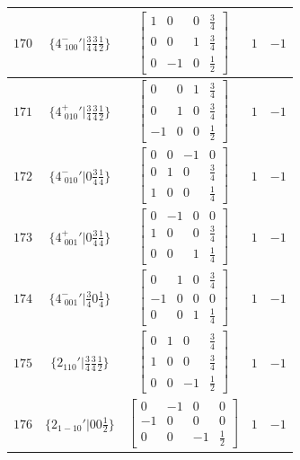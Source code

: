 \documentclass[fleqn,8pt]{jsarticle}
\begin{document}
\begin{longtable}{ccccc}
$ 170 $ & $ \{4^{-}_{\,\,100}{}'|\frac{3}{4} \frac{3}{4} \frac{1}{2}\} $ & $ \begin{bmatrix} 1 & 0 & 0 & \frac{3}{4} \\ 0 & 0 & 1 & \frac{3}{4} \\ 0 & -1 & 0 & \frac{1}{2} \end{bmatrix} $ & $ 1 $ & $ -1 $ \\ \hline
$ 171 $ & $ \{4^{+}_{\,\,010}{}'|\frac{3}{4} \frac{3}{4} \frac{1}{2}\} $ & $ \begin{bmatrix} 0 & 0 & 1 & \frac{3}{4} \\ 0 & 1 & 0 & \frac{3}{4} \\ -1 & 0 & 0 & \frac{1}{2} \end{bmatrix} $ & $ 1 $ & $ -1 $ \\ \hline
$ 172 $ & $ \{4^{-}_{\,\,010}{}'|0 \frac{3}{4} \frac{1}{4}\} $ & $ \begin{bmatrix} 0 & 0 & -1 & 0 \\ 0 & 1 & 0 & \frac{3}{4} \\ 1 & 0 & 0 & \frac{1}{4} \end{bmatrix} $ & $ 1 $ & $ -1 $ \\ \hline
$ 173 $ & $ \{4^{+}_{\,\,001}{}'|0 \frac{3}{4} \frac{1}{4}\} $ & $ \begin{bmatrix} 0 & -1 & 0 & 0 \\ 1 & 0 & 0 & \frac{3}{4} \\ 0 & 0 & 1 & \frac{1}{4} \end{bmatrix} $ & $ 1 $ & $ -1 $ \\ \hline
$ 174 $ & $ \{4^{-}_{\,\,001}{}'|\frac{3}{4} 0 \frac{1}{4}\} $ & $ \begin{bmatrix} 0 & 1 & 0 & \frac{3}{4} \\ -1 & 0 & 0 & 0 \\ 0 & 0 & 1 & \frac{1}{4} \end{bmatrix} $ & $ 1 $ & $ -1 $ \\ \hline
$ 175 $ & $ \{2{}_{110}{}'|\frac{3}{4} \frac{3}{4} \frac{1}{2}\} $ & $ \begin{bmatrix} 0 & 1 & 0 & \frac{3}{4} \\ 1 & 0 & 0 & \frac{3}{4} \\ 0 & 0 & -1 & \frac{1}{2} \end{bmatrix} $ & $ 1 $ & $ -1 $ \\ \hline
$ 176 $ & $ \{2{}_{1-10}{}'|0 0 \frac{1}{2}\} $ & $ \begin{bmatrix} 0 & -1 & 0 & 0 \\ -1 & 0 & 0 & 0 \\ 0 & 0 & -1 & \frac{1}{2} \end{bmatrix} $ & $ 1 $ & $ -1 $ \\ \hline

\end{longtable}
\end{document}
